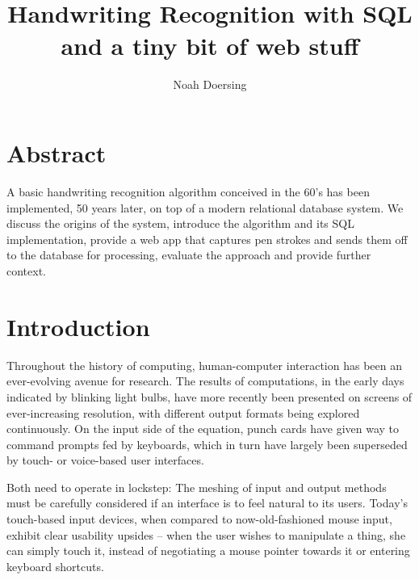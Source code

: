 \documentclass[sigconf]{acmart}
\begin{document}
\title{\\\vspace{-0.3em}Handwriting Recognition with SQL\\\vspace{-0.1em}\hspace{6.88cm}\footnotesize and a tiny bit of web stuff\vspace{-1em}}
\author{Noah Doersing}
\affiliation{}

\maketitle

\section*{Abstract}
A basic handwriting recognition algorithm conceived in the 60's has been implemented, 50 years later, on top of a modern relational database system. We discuss the origins of the system, introduce the algorithm and its SQL implementation, provide a web app that captures pen strokes and sends them off to the database for processing, evaluate the approach and provide further context.

\section{Introduction}

Throughout the history of computing, human-computer interaction has been an ever-evolving avenue for research. The results of computations, in the early days indicated by blinking light bulbs, have more recently been presented on screens of ever-increasing resolution, with different output formats being explored continuously. On the input side of the equation, punch cards have given way to command prompts fed by keyboards, which in turn have largely been superseded by touch- or voice-based user interfaces.

Both need to operate in lockstep: The meshing of input and output methods must be carefully considered if an interface is to feel natural to its users. Today's touch-based input devices, when compared to now-old-fashioned mouse input, exhibit clear usability upsides – when the user wishes to manipulate a thing, she can simply touch it, instead of negotiating a mouse pointer towards it or entering keyboard shortcuts.
\end{document}
